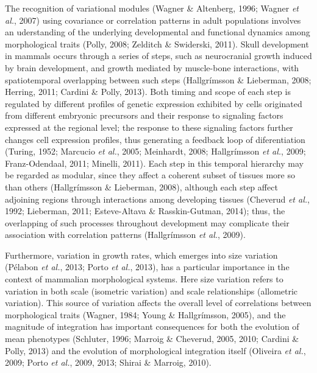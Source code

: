\documentclass[12pt,twoside]{report}
\begin{document}
The recognition of variational modules (Wagner \& Altenberg, 1996;
Wagner \emph{et al.}, 2007) using covariance or correlation patterns in
adult populations involves an uderstanding of the underlying
developmental and functional dynamics among morphological traits (Polly,
2008; Zelditch \& Swiderski, 2011). Skull development in mammals occurs
through a series of steps, such as neurocranial growth induced by brain
development, and growth mediated by muscle-bone interactions, with
spatiotemporal overlapping between such steps (Hallgrímsson \&
Lieberman, 2008; Herring, 2011; Cardini \& Polly, 2013). Both timing and
scope of each step is regulated by different profiles of genetic
expression exhibited by cells originated from different embryonic
precursors and their response to signaling factors expressed at the
regional level; the response to these signaling factors further changes
cell expression profiles, thus generating a feedback loop of
diferentiation (Turing, 1952; Marcucio \emph{et al.}, 2005; Meinhardt,
2008; Hallgrímsson \emph{et al.}, 2009; Franz-Odendaal, 2011; Minelli,
2011). Each step in this temporal hierarchy may be regarded as modular,
since they affect a coherent subset of tissues more so than others
(Hallgrímsson \& Lieberman, 2008), although each step affect adjoining
regions through interactions among developing tissues (Cheverud \emph{et
al.}, 1992; Lieberman, 2011; Esteve-Altava \& Rasskin-Gutman, 2014);
thus, the overlapping of such processes throughout development may
complicate their association with correlation patterns (Hallgrímsson
\emph{et al.}, 2009).

Furthermore, variation in growth rates, which emerges into size
variation (Pélabon \emph{et al.}, 2013; Porto \emph{et al.}, 2013), has
a particular importance in the context of mammalian morphological
systems. Here size variation refers to variation in both scale
(isometric variation) and scale relationships (allometric variation).
This source of variation affects the overall level of correlations
between morphological traits (Wagner, 1984; Young \& Hallgrímsson,
2005), and the magnitude of integration has important consequences for
both the evolution of mean phenotypes (Schluter, 1996; Marroig \&
Cheverud, 2005, 2010; Cardini \& Polly, 2013) and the evolution of
morphological integration itself (Oliveira \emph{et al.}, 2009; Porto
\emph{et al.}, 2009, 2013; Shirai \& Marroig, 2010).
\end{document}
